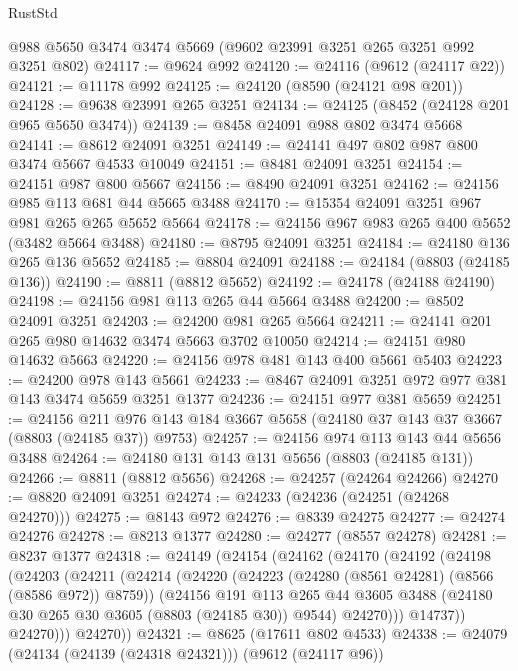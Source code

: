 \begin{lexlean}{RustStd}
\begin{coremodule}
    @988
    @5650
    @3474
    @3474
    @5669
    (@9602 @23991 @3251 @265 @3251 @992 @3251 @802)
@24117 := @9624 @992
@24120 := @24116 (@9612 (@24117 @22))
@24121 := @11178 @992
@24125 := @24120 (@8590 (@24121 @98 @201))
@24128 := @9638 @23991 @265 @3251
@24134 := @24125 (@8452 (@24128 @201 @965 @5650 @3474))
@24139 := @8458 @24091 @988 @802 @3474 @5668
@24141 := @8612 @24091 @3251
@24149 := @24141 @497 @802 @987 @800 @3474 @5667 @4533 @10049
@24151 := @8481 @24091 @3251
@24154 := @24151 @987 @800 @5667
@24156 := @8490 @24091 @3251
@24162 := @24156 @985 @113 @681 @44 @5665 @3488
@24170 := @15354 @24091 @3251 @967 @981 @265 @265 @5652 @5664
@24178 := @24156 @967 @983 @265 @400 @5652 (@3482 @5664 @3488)
@24180 := @8795 @24091 @3251
@24184 := @24180 @136 @265 @136 @5652
@24185 := @8804 @24091
@24188 := @24184 (@8803 (@24185 @136))
@24190 := @8811 (@8812 @5652)
@24192 := @24178 (@24188 @24190)
@24198 := @24156 @981 @113 @265 @44 @5664 @3488
@24200 := @8502 @24091 @3251
@24203 := @24200 @981 @265 @5664
@24211 := @24141 @201 @265 @980 @14632 @3474 @5663 @3702 @10050
@24214 := @24151 @980 @14632 @5663
@24220 := @24156 @978 @481 @143 @400 @5661 @5403
@24223 := @24200 @978 @143 @5661
@24233 := @8467 @24091 @3251 @972 @977 @381 @143 @3474 @5659 @3251 @1377
@24236 := @24151 @977 @381 @5659
@24251 := @24156
    @211
    @976
    @143
    @184
    @3667
    @5658
    (@24180 @37 @143 @37 @3667 (@8803 (@24185 @37)) @9753)
@24257 := @24156 @974 @113 @143 @44 @5656 @3488
@24264 := @24180 @131 @143 @131 @5656 (@8803 (@24185 @131))
@24266 := @8811 (@8812 @5656)
@24268 := @24257 (@24264 @24266)
@24270 := @8820 @24091 @3251
@24274 := @24233 (@24236 (@24251 (@24268 @24270)))
@24275 := @8143 @972
@24276 := @8339 @24275
@24277 := @24274 @24276
@24278 := @8213 @1377
@24280 := @24277 (@8557 @24278)
@24281 := @8237 @1377
@24318 := @24149
    (@24154
      (@24162
        (@24170
          (@24192
            (@24198
              (@24203
                (@24211
                  (@24214
                    (@24220
                      (@24223 (@24280 (@8561 @24281) (@8566 (@8586 @972)) @8759))
                      (@24156
                        @191
                        @113
                        @265
                        @44
                        @3605
                        @3488
                        (@24180 @30 @265 @30 @3605 (@8803 (@24185 @30)) @9544)
                        @24270)))
                  @14737))
              @24270)))
        @24270))
@24321 := @8625 (@17611 @802 @4533)
@24338 := @24079
    (@24134 (@24139 (@24318 @24321)))
    (@9612 (@24117 @96))

\end{coremodule}
\end{lexlean}
